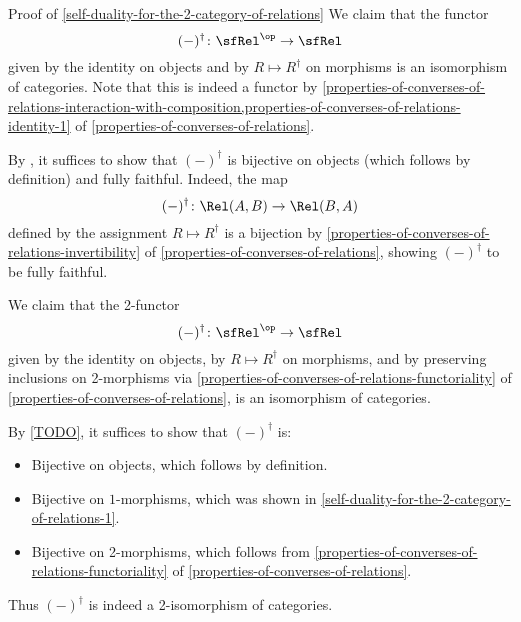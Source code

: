\begin{Proof}{Proof of \cref{self-duality-for-the-2-category-of-relations}}%
    We claim that the functor
    \[
        (-)^{\dagger}%
        \colon%
        \sfRel^{\op}%
        \to%
        \sfRel%
    \]%
    given by the identity on objects and by $R\mapsto R^{\dagger}$ on morphisms is an isomorphism of categories. Note that this is indeed a functor by \cref{properties-of-converses-of-relations-interaction-with-composition,properties-of-converses-of-relations-identity-1} of \cref{properties-of-converses-of-relations}.

    \indent By , it suffices to show that $(-)^{\dagger}$ is bijective on objects (which follows by definition) and fully faithful. Indeed, the map
    \[
        (-)^{\dagger}%
        \colon%
        \Rel(A,B)%
        \to%
        \Rel(B,A)%
    \]%
    defined by the assignment $R\mapsto R^{\dagger}$ is a bijection by \cref{properties-of-converses-of-relations-invertibility} of \cref{properties-of-converses-of-relations}, showing $(-)^{\dagger}$ to be fully faithful.

    We claim that the 2-functor
    \[
        (-)^{\dagger}%
        \colon%
        \sfRel^{\op}%
        \to%
        \sfRel%
    \]%
    given by the identity on objects, by $R\mapsto R^{\dagger}$ on morphisms, and by preserving inclusions on 2-morphisms via \cref{properties-of-converses-of-relations-functoriality} of \cref{properties-of-converses-of-relations}, is an isomorphism of categories.

    \indent By \cref{TODO}, it suffices to show that $(-)^{\dagger}$ is:
    \begin{itemize}
        \item Bijective on objects, which follows by definition.
        \item Bijective on $1$-morphisms, which was shown in \cref{self-duality-for-the-2-category-of-relations-1}.
        \item Bijective on 2-morphisms, which follows from \cref{properties-of-converses-of-relations-functoriality} of \cref{properties-of-converses-of-relations}.
    \end{itemize}
    Thus $(-)^{\dagger}$ is indeed a 2-isomorphism of categories.
\end{Proof}
